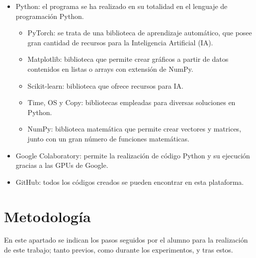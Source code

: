 \documentclass{report}
\begin{document}
\begin{itemize}
    \item Python: el programa se ha realizado en su totalidad en el lenguaje de programación Python.
    \begin{itemize}
        \item PyTorch: se trata de una biblioteca de aprendizaje automático, que posee gran cantidad de recursos para la Inteligencia Artificial (IA).
        \item Matplotlib: biblioteca que permite crear gráficos a partir de datos contenidos en listas o arrays con extensión de NumPy.
        \item Scikit-learn: biblioteca que ofrece recursos para IA.
        \item Time, OS y Copy: bibliotecas empleadas para diversas soluciones en Python. 
        \item NumPy: biblioteca matemática que permite crear vectores y matrices, junto con un gran número de funciones matemáticas.
    \end{itemize}
    \item Google Colaboratory: permite la realización de código Python y su ejecución gracias a las GPUs de Google.
    \item GitHub: todos los códigos creados se pueden encontrar en esta plataforma.
\end{itemize}

\section{Metodología}

En este apartado se indican los pasos seguidos por el alumno para la realización de este trabajo; tanto previos, como durante los experimentos, y tras estos.
\end{document}
